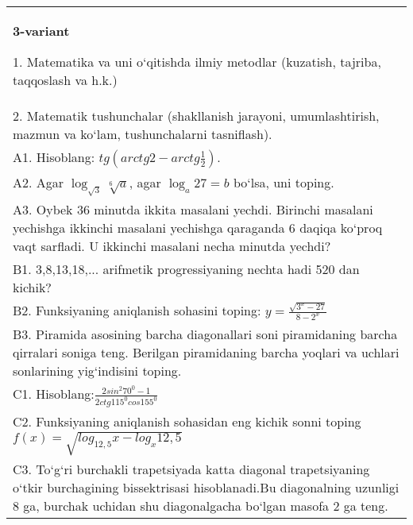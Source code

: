 \documentclass{article}
\begin{document}
\begin{tabular}{m{17cm}}
\textbf{3-variant}

1. Matematika va uni o‘qitishda ilmiy metodlar (kuzatish, tajriba, taqqoslash va h.k.) \\
2. Matematik tushunchalar (shakllanish jarayoni, umumlashtirish, mazmun va ko‘lam, tushunchalarni tasniflash). \\
A1. Hisoblang: \(tg\left (arctg2 - arctg\frac{1}{2} \right) \). \\
A2. Agar \(\log_{\sqrt{3}}\sqrt[6]{a}\), agar \(\log_{a}27 = b\) bo‘lsa, uni toping. \\
A3. Oybek 36 minutda ikkita masalani yechdi. Birinchi masalani yechishga ikkinchi masalani yechishga qaraganda 6 daqiqa ko‘proq vaqt sarfladi. U ikkinchi masalani necha minutda yechdi? \\
B1. 3,8,13,18,... arifmetik progressiyaning nechta hadi 520 dan kichik? \\
B2. Funksiyaning aniqlanish sohasini toping: \(y = \frac{\sqrt{3^{x} - 27}}{8 - 2^{x}}\) \\
B3. Piramida asosining barcha diagonallari soni piramidaning barcha qirralari soniga teng. Berilgan piramidaning barcha yoqlari va uchlari sonlarining yig‘indisini toping. \\
C1. Hisoblang:\(\frac{2sin^{2}70^{0} - 1}{2ctg115^{0}cos155^{0}}\) \\
C2. Funksiyaning aniqlanish sohasidan eng kichik sonni toping \(f (x) = \sqrt{log_{12,5}x - log_{x}12,5}\) \\
C3. To‘g‘ri burchakli trapetsiyada katta diagonal trapetsiyaning o‘tkir burchagining bissektrisasi hisoblanadi.Bu diagonalning uzunligi 8 ga, burchak uchidan shu diagonalgacha bo‘lgan masofa 2 ga teng. \\

\end{tabular}
\vspace{1cm}
\end{document}
